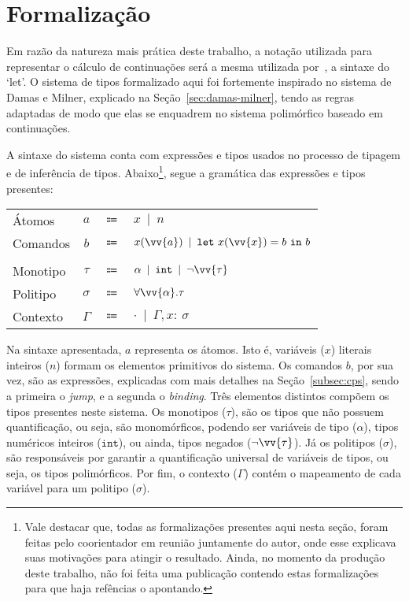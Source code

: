\section{Formalização}\label{sec:formalizacao}

Em razão da natureza mais prática deste trabalho, a notação utilizada para representar o cálculo de continuações será a mesma utilizada por~\cite{appel1997shrinking}, a sintaxe do `let'.
O sistema de tipos formalizado aqui foi fortemente inspirado no sistema de Damas e Milner, explicado na Seção~\ref{sec:damas-milner}, tendo as regras adaptadas de modo que elas se enquadrem no sistema polimórfico baseado em continuações.

A sintaxe do sistema conta com expressões e tipos usados no processo de tipagem e de inferência de tipos.
Abaixo\footnote{Vale destacar que, todas as formalizações presentes aqui nesta seção, foram feitas pelo coorientador em reunião juntamente do autor, onde esse explicava suas motivações para atingir o resultado. Ainda, no momento da produção deste trabalho, não foi feita uma publicação contendo estas formalizações para que haja refências o apontando.}, segue a gramática das expressões e tipos presentes:

\phantom{Newline}

\begin{tabular}{lccl}\label{cps-type-system}
  Átomos & $a$ & $\Coloneqq$ & $x \enspace|\enspace n$ \\
  Comandos & $b$ & $\Coloneqq$ & $x(\vv{a}) \enspace|\enspace \mathtt{let}\ x(\vv{x}) = b\ \mathtt{in}\ b$ \\
  \\
  Monotipo & $\tau$ & $\Coloneqq$ & $\alpha \enspace|\enspace \mathtt{int} \enspace|\enspace \neg\vv{\tau}$ \\
  Politipo & $\sigma$ & $\Coloneqq$ & $\forall\vv{\alpha}.\tau$ \\
  Contexto & $\Gamma$ & $\Coloneqq$ & $\cdot \enspace|\enspace \Gamma, x{:}\ \sigma$ \\
\end{tabular}

\phantom{Newline}

Na sintaxe apresentada, $a$ representa os átomos. Isto é, variáveis ($x$) literais inteiros ($n$) formam os elementos primitivos do sistema.
Os comandos $b$, por sua vez, são as expressões, explicadas com mais detalhes na Seção~\ref{subsec:cps}, sendo a primeira o \textit{jump}, e a segunda o \textit{binding}.
Três elementos distintos compõem os tipos presentes neste sistema.
Os monotipos ($\tau$), são os tipos que não possuem quantificação, ou seja, são monomórficos, podendo ser variáveis de tipo ($\alpha$), tipos numéricos inteiros ($\mathtt{int}$), ou ainda, tipos negados ($\neg\vv{\tau}$).
Já os politipos ($\sigma$), são responsáveis por garantir a quantificação universal de variáveis de tipos, ou seja, os tipos polimórficos.
Por fim, o contexto ($\Gamma$) contém o mapeamento de cada variável para um politipo ($\sigma$).

